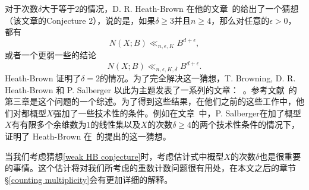 对于次数$\delta$大于等于$2$的情况，D. R. Heath-Brown 在他的文章~的给出了一个猜想（该文章的Conjecture 2），说的是，如果$\delta \geqslant 3$并且$n \geqslant 4$，那么对任意的$\epsilon > 0$，都有
\begin{equation}
\label{strong HB conjecture}
N(X;B) \ll_{n,\epsilon,K} B^{d+\epsilon},
\end{equation}
或者一个更弱一些的结论
\begin{equation}
\label{weak HB conjecture}
N(X;B) \ll_{n,\epsilon,K,\delta} B^{d+\epsilon}.
\end{equation}
Heath-Brown 证明了$\delta=2$的情况。为了完全解决这一猜想，T. Browning, D. R. Heath-Brown 和 P. Salberger 以此为主题发表了一系列的文章：~。参考文献~的第三章是这个问题的一个综述。为了得到这些结果，在他们之前的这些工作中，他们对都概型$X$强加了一些技术性的条件。例如在文章~中，P. Salberger在加了概型$X$有有限多个余维数为$1$的线性集以及$X$的次数$\delta\geqslant4$的两个技术性条件的情况下，证明了 Heath-Brown 在~的提出的这一猜想。

当我们考虑猜想\eqref{weak HB conjecture}时，考虑估计式中概型$X$的次数$\delta$也是很重要的事情。这个估计将对我们所考虑的重数计数问题很有用处，在本文之后的章节\S\ref{counting multiplicity}会有更加详细的解释。
